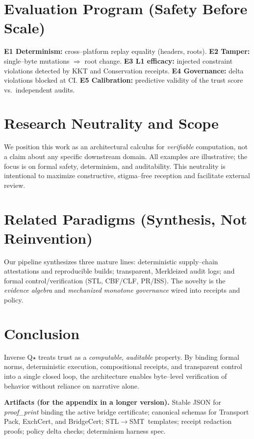 \documentclass[11pt]{article}
\theoremstyle{plain}
\theoremstyle{definition}
\theoremstyle{remark}
\newcommand{\stl}{\textsc{STL}}
\newcommand{\smt}{\textsc{SMT}}
\begin{document}
\section{Evaluation Program (Safety Before Scale)}
\textbf{E1 Determinism:} cross--platform replay equality (headers, roots). \textbf{E2 Tamper:} single--byte mutations $\Rightarrow$ root change. \textbf{E3 L1 efficacy:} injected constraint violations detected by KKT and Conservation receipts. \textbf{E4 Governance:} delta violations blocked at CI. \textbf{E5 Calibration:} predictive validity of the trust score vs.\ independent audits.

\section{Research Neutrality and Scope}
We position this work as an architectural calculus for \emph{verifiable} computation, not a claim about any specific downstream domain. All examples are illustrative; the focus is on formal safety, determinism, and auditability. This neutrality is intentional to maximize constructive, stigma--free reception and facilitate external review.

\section{Related Paradigms (Synthesis, Not Reinvention)}
Our pipeline synthesizes three mature lines: deterministic supply--chain attestations and reproducible builds; transparent, Merkleized audit logs; and formal control/verification (STL, CBF/CLF, PR/ISS). The novelty is the \emph{evidence algebra} and \emph{mechanized monotone governance} wired into receipts and policy.

\section{Conclusion}
Inverse Q$\star$ treats trust as a \emph{computable}, \emph{auditable} property. By binding formal norms, deterministic execution, compositional receipts, and transparent control into a single closed loop, the architecture enables byte--level verification of behavior without reliance on narrative alone.

\vspace{6pt}
\noindent\textbf{Artifacts (for the appendix in a longer version).}
Stable JSON for \emph{proof\_print} binding the active bridge certificate; canonical schemas for Transport Pack, ExchCert, and BridgeCert; \stl$\to$\smt\ templates; receipt redaction proofs; policy delta checks; determinism harness spec.
\end{document}
